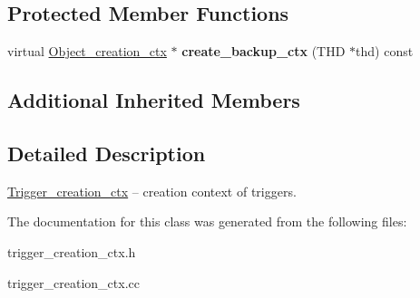 \subsection*{Protected Member Functions}
\begin{DoxyCompactItemize}
\item 
\mbox{\label{classTrigger__creation__ctx_a37d94fe5b816d5ac3893571410048831}} 
virtual \mbox{\hyperlink{classObject__creation__ctx}{Object\+\_\+creation\+\_\+ctx}} $\ast$ {\bfseries create\+\_\+backup\+\_\+ctx} (T\+HD $\ast$thd) const
\end{DoxyCompactItemize}
\subsection*{Additional Inherited Members}


\subsection{Detailed Description}
\mbox{\hyperlink{classTrigger__creation__ctx}{Trigger\+\_\+creation\+\_\+ctx}} -- creation context of triggers. 

The documentation for this class was generated from the following files\+:\begin{DoxyCompactItemize}
\item 
trigger\+\_\+creation\+\_\+ctx.\+h\item 
trigger\+\_\+creation\+\_\+ctx.\+cc\end{DoxyCompactItemize}
